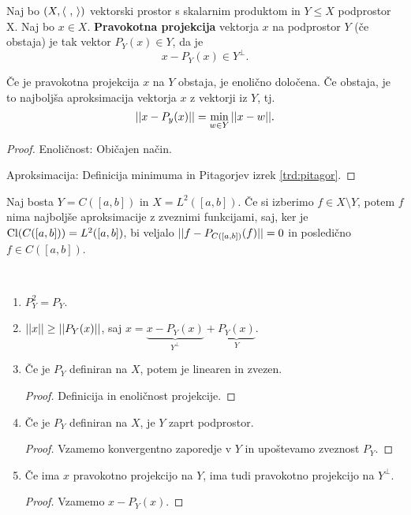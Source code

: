 \begin{definicija}
    Naj bo \((X, \langle \ , \,  \rangle)\) vektorski prostor s skalarnim produktom in \(Y \leq X\) podprostor X. Naj bo \(x \in X\). \textbf{Pravokotna projekcija} vektorja \(x\) na podprostor \(Y\) (če obstaja) je tak vektor \(P_Y(x) \in Y\), da je 
    \[x - P_Y(x) \in Y^\perp.\]
\end{definicija}

\begin{trditev}
    Če je pravokotna projekcija \(x\) na \(Y\) obstaja, je enolično določena. Če obstaja, je to najboljša aproksimacija vektorja \(x\) z vektorji iz \(Y\), tj.
    \[||x - P_y(x)|| = \min_{w \in Y} ||x - w||.\]
\end{trditev}

\begin{proof}
    Enoličnost: Običajen način.

    Aproksimacija: Definicija minimuma in Pitagorjev izrek \ref{trd:pitagor}.
\end{proof}

\begin{zgled}
    Naj bosta \(Y = C([a,b])\) in \(X = L^2([a, b])\). Če si izberimo \(f \in X \setminus Y\), potem \(f\) nima najboljše aproksimacije z zveznimi funkcijami, saj, ker je \(\operatorname{Cl} (C([a,b])) = L^2([a, b])\), bi veljalo \(||f - P_{C([a,b])}(f)|| = 0\) in posledično \(f \in C([a, b])\).
\end{zgled}

\begin{opomba}
    \ 
    \begin{enumerate}
        \item \(P_Y^2 = P_Y\).
        \item \(||x|| \geq ||P_Y(x)||\), saj \(x = \underbrace{x - P_Y(x)}_{Y^\perp} + \underbrace{P_Y(x)}_Y\).
        \item Če je \(P_Y\) definiran na \(X\), potem je linearen in zvezen.
        \begin{proof}
            Definicija in enoličnost projekcije.
        \end{proof}
        \item Če je \(P_Y\) definiran na \(X\), je \(Y\) zaprt podprostor.
        \begin{proof}
            Vzamemo konvergentno zaporedje v \(Y\) in upoštevamo zveznost \(P_Y\).
        \end{proof}
        \newpage
        \item Če ima \(x\) pravokotno projekcijo na \(Y\), ima tudi pravokotno projekcijo na \(Y^\perp\).
        \begin{proof}
            Vzamemo \(x - P_Y(x)\).
        \end{proof}
    \end{enumerate}
\end{opomba}

